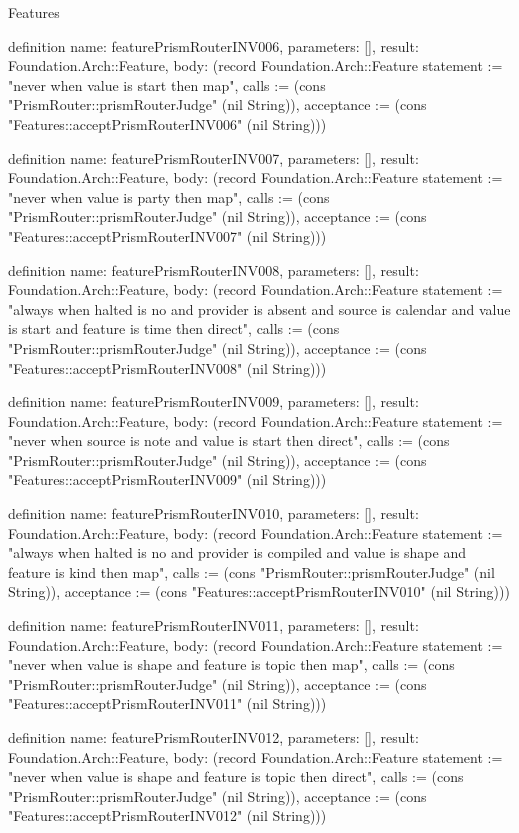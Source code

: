\begin{lexlean}{Features}
\begin{semanticmodule}
definition{
  name: featurePrismRouterINV006,
  parameters: [],
  result: Foundation.Arch::Feature,
  body: (record Foundation.Arch::Feature {statement := "never when value is start then map", calls := (cons "PrismRouter::prismRouterJudge" (nil String)), acceptance := (cons "Features::acceptPrismRouterINV006" (nil String))})
}

definition{
  name: featurePrismRouterINV007,
  parameters: [],
  result: Foundation.Arch::Feature,
  body: (record Foundation.Arch::Feature {statement := "never when value is party then map", calls := (cons "PrismRouter::prismRouterJudge" (nil String)), acceptance := (cons "Features::acceptPrismRouterINV007" (nil String))})
}

definition{
  name: featurePrismRouterINV008,
  parameters: [],
  result: Foundation.Arch::Feature,
  body: (record Foundation.Arch::Feature {statement := "always when halted is no and provider is absent and source is calendar and value is start and feature is time then direct", calls := (cons "PrismRouter::prismRouterJudge" (nil String)), acceptance := (cons "Features::acceptPrismRouterINV008" (nil String))})
}

definition{
  name: featurePrismRouterINV009,
  parameters: [],
  result: Foundation.Arch::Feature,
  body: (record Foundation.Arch::Feature {statement := "never when source is note and value is start then direct", calls := (cons "PrismRouter::prismRouterJudge" (nil String)), acceptance := (cons "Features::acceptPrismRouterINV009" (nil String))})
}

definition{
  name: featurePrismRouterINV010,
  parameters: [],
  result: Foundation.Arch::Feature,
  body: (record Foundation.Arch::Feature {statement := "always when halted is no and provider is compiled and value is shape and feature is kind then map", calls := (cons "PrismRouter::prismRouterJudge" (nil String)), acceptance := (cons "Features::acceptPrismRouterINV010" (nil String))})
}

definition{
  name: featurePrismRouterINV011,
  parameters: [],
  result: Foundation.Arch::Feature,
  body: (record Foundation.Arch::Feature {statement := "never when value is shape and feature is topic then map", calls := (cons "PrismRouter::prismRouterJudge" (nil String)), acceptance := (cons "Features::acceptPrismRouterINV011" (nil String))})
}

definition{
  name: featurePrismRouterINV012,
  parameters: [],
  result: Foundation.Arch::Feature,
  body: (record Foundation.Arch::Feature {statement := "never when value is shape and feature is topic then direct", calls := (cons "PrismRouter::prismRouterJudge" (nil String)), acceptance := (cons "Features::acceptPrismRouterINV012" (nil String))})
}


\end{semanticmodule}
\end{lexlean}
